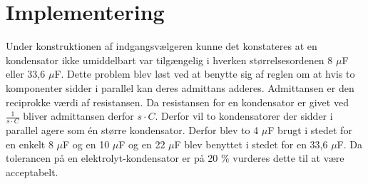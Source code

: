 \section{Implementering}
Under konstruktionen af indgangsvælgeren kunne det konstateres at en kondensator ikke umiddelbart var tilgængelig i hverken størrelsesordenen 8 $\mu$F eller 33,6 $\mu$F. Dette problem blev løst ved at benytte sig af reglen om at hvis to komponenter sidder i parallel kan deres admittans adderes. Admittansen er den reciprokke værdi af resistansen. Da resistansen for en kondensator er givet ved $\frac{1}{s\cdot C}$ bliver admittansen derfor $s\cdot C$. Derfor vil to kondensatorer der sidder i parallel agere som én større kondensator. Derfor blev to 4 $\mu$F brugt i stedet for en enkelt 8 $\mu$F og en 10 $\mu$F og en 22 $\mu$F blev benyttet i stedet for en 33,6 $\mu$F. Da tolerancen på en elektrolyt-kondensator er på 20 \% \cite{electrolyt} %
vurderes dette til at være acceptabelt.
